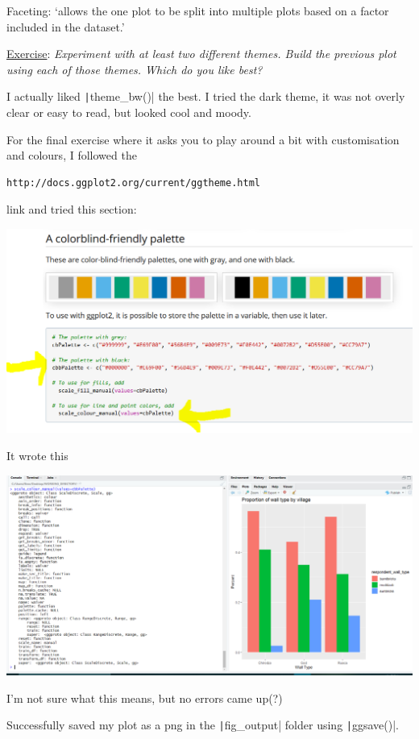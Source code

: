 \documentclass{article}
\begin{document}
Faceting: `allows the one plot to be split into multiple plots based on a factor included in the dataset.’

\underline{Exercise}: \textit{Experiment with at least two different themes. Build the previous plot using each of those themes. Which do you like best?}

I actually liked \texttt|theme_bw()| the best. I tried the dark theme, it was not overly clear or easy to read, but looked cool and moody.

{\item For the final exercise where it asks you to play around a bit with customisation and colours, I followed the}
\begin{verbatim}http://docs.ggplot2.org/current/ggtheme.html\end{verbatim}
link and tried this section:

\includegraphics[width=1.0\textwidth]{rstudio_27.PNG}

It wrote this

\includegraphics[width=1.0\textwidth]{rstudio_28.PNG}

I’m not sure what this means, but no errors came up(?)

Successfully saved my plot as a png in the \texttt|fig_output| folder using \texttt|ggsave()|.
\end{document}

